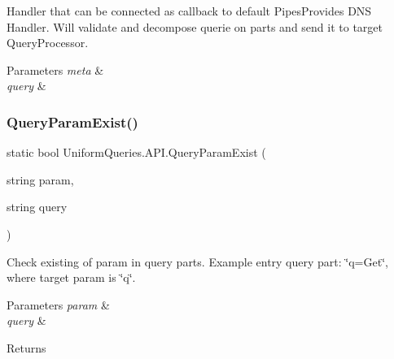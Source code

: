 Handler that can be connected as callback to default Pipes\+Provides D\+NS Handler. Will validate and decompose querie on parts and send it to target Query\+Processor. 


\begin{DoxyParams}{Parameters}
{\em meta} & \\
\hline
{\em query} & \\
\hline
\end{DoxyParams}
\mbox{\label{class_uniform_queries_1_1_a_p_i_a1a0ad73e1dad7f7ec61398cb33ec18a4}} 
\subsubsection{\texorpdfstring{Query\+Param\+Exist()}{QueryParamExist()}\hspace{0.1cm}{\footnotesize\ttfamily [1/3]}}
{\footnotesize\ttfamily static bool Uniform\+Queries.\+A\+P\+I.\+Query\+Param\+Exist (\begin{DoxyParamCaption}\item[{string}]{param,  }\item[{string}]{query }\end{DoxyParamCaption})\hspace{0.3cm}{\ttfamily [static]}}



Check existing of param in query parts. Example entry query part\+: \char`\"{}q=\+Get\char`\"{}, where target param is \char`\"{}q\char`\"{}. 


\begin{DoxyParams}{Parameters}
{\em param} & \\
\hline
{\em query} & \\
\hline
\end{DoxyParams}
\begin{DoxyReturn}{Returns}

\end{DoxyReturn}
\mbox{\label{class_uniform_queries_1_1_a_p_i_a0f6c53ca64000015c8bf7bed30d9c57a}} 
